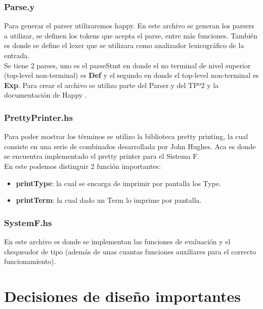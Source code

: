 \documentclass[12pt, titlepage, a4paper]{article}
\begin{document}
\subsubsection{Parse.y}
Para generar el parser utilizaremos happy. En este archivo se generan los parsers a utilizar, se definen los tokens que acepta el parse, 
entre más funciones. También es donde se define el lexer que se utilizara como analizador lexicográfico de la entrada. \\ 

Se tiene 2 parses, uno es el parseStmt en donde el no terminal de nivel superior (top-level non-terminal) es \textbf{Def} y el 
segundo en donde el top-level non-terminal es \textbf{Exp}. 
Para crear el archivo se utilizo parte del Parser.y del TPº2 \cite{tp2:lambdaCalculoSimpleTipado} y la documentación de Happy \cite{haskellHappy}. \\

\subsubsection{PrettyPrinter.hs}
Para poder mostrar los términos se utilizo la biblioteca pretty printing, la cual consiste en una serie de combinados desarrollada por John Hughes. Aca es 
donde se encuentra implementado el pretty printer para el Sistema F. \\
En este podemos distinguir 2 función importantes:
\begin{itemize}[label=$\bullet$]
  \item {\textbf{printType}: la cual se encarga de imprimir por pantalla los Type.}
  \item {\textbf{printTerm}: la cual dado un Term lo imprime por pantalla.}
\end{itemize}

\subsubsection{SystemF.hs}
En este archivo es donde se implementan las funciones de evaluación y el chequeador de tipo (además de unas cuantas funciones auxiliares 
para el correcto funcionamiento).

\section{Decisiones de diseño importantes}
\end{document}

